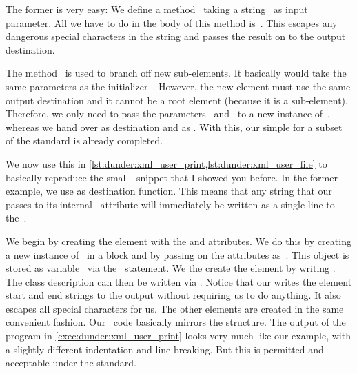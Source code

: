 The former is very easy:
We define a method~ taking a string~ as input parameter.
All we have to do in the body of this method is~.
This escapes any dangerous  special characters in the string and passes the result on to the output destination.

The method~ is used to branch off new sub-elements.
It basically would take the same parameters as the initializer~.
However, the new element must use the same output destination and it cannot be a root element (because it is a sub-element).
Therefore, we only need to pass the parameters~ and~ to a new instance of~, whereas we hand over  as destination and  as .
With this, our simple  for a subset of the  standard is already completed.%
%
%
%
%
%
%

We now use this  in \cref{lst:dunder:xml_user_print,lst:dunder:xml_user_file} to basically reproduce the small ~snippet that I showed you before.
In the former example, we use  as destination function.
This means that any string that our  passes to its internal ~attribute will immediately be written as a single line to the~.

We begin by creating the  element with the  and  attributes.
We do this by creating a new instance of~ in a  block and by passing on the attributes as~.
This object is stored as variable~ via the ~statement.
We the create the  element by writing .
The class description can then be written via .
Notice that our  writes the element start and end strings to the output without requiring us to do anything.
It also escapes all special characters for us.
The other elements are created in the same convenient fashion.
Our \python\ code basically mirrors the  structure.
The output of the program in \cref{exec:dunder:xml_user_print} looks very much like our example, with a slightly different indentation and line breaking.
But this is permitted and acceptable under the  standard.

